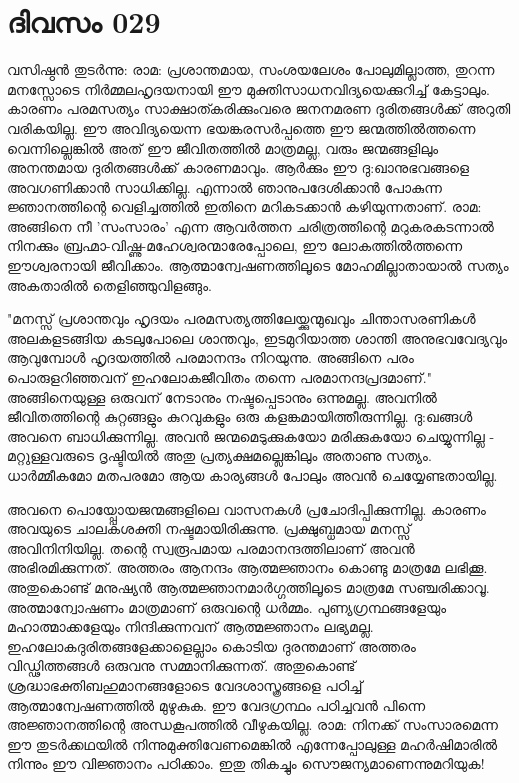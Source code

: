 \newpage
\section{ദിവസം 029}


വസിഷ്ഠന്‍ തുടര്‍ന്നു: രാമ: പ്രശാന്തമായ, സംശയലേശം പോലുമില്ലാത്ത, തുറന്ന മനസ്സോടെ നിര്‍മ്മലഹൃദയനായി ഈ മുക്തിസാധനവിദ്യയെക്കുറിച്ച്‌ കേട്ടാലും. കാരണം പരമസത്യം സാക്ഷാത്കരിക്കുംവരെ ജനനമരണ ദുരിതങ്ങള്‍ക്ക്‌ അറുതി വരികയില്ല. ഈ അവിദ്യയെന്ന ഭയങ്കരസര്‍പ്പത്തെ ഈ ജന്മത്തില്‍ത്തന്നെ വെന്നില്ലെങ്കില്‍ അത്‌ ഈ ജീവിതത്തില്‍ മാത്രമല്ല, വരും ജന്മങ്ങളിലും അനന്തമായ ദുരിതങ്ങള്‍ക്ക്‌ കാരണമാവും. ആര്‍ക്കും ഈ ദു:ഖാനുഭവങ്ങളെ അവഗണിക്കാന്‍ സാധിക്കില്ല. എന്നാല്‍ ഞാനുപദേശിക്കാന്‍ പോകുന്ന ജ്ഞാനത്തിന്റെ വെളിച്ചത്തില്‍ ഇതിനെ മറികടക്കാന്‍ കഴിയുന്നതാണ്‌. രാമ: അങ്ങിനെ നീ 'സംസാരം' എന്ന ആവര്‍ത്തന ചരിത്രത്തിന്റെ മറുകരകടന്നാല്‍ നിനക്കും ബ്രഹ്മാ-വിഷ്ണു-മഹേശ്വരന്മാരേപ്പോലെ, ഈ ലോകത്തില്‍ത്തന്നെ ഈശ്വരനായി ജീവിക്കാം. ആത്മാന്വേഷണത്തിലൂടെ മോഹമില്ലാതായാല്‍ സത്യം അകതാരില്‍ തെളിഞ്ഞുവിളങ്ങും. 

"മനസ്സ്‌ പ്രശാന്തവും ഹൃദയം പരമസത്യത്തിലേയ്ക്കുന്മുഖവും ചിന്താസരണികള്‍ അലകളടങ്ങിയ കടലുപോലെ ശാന്തവും, ഇടമുറിയാത്ത ശാന്തി അനുഭവവേദ്യവും ആവുമ്പോള്‍ ഹൃദയത്തില്‍ പരമാനന്ദം നിറയുന്നു. അങ്ങിനെ പരം പൊരുളറിഞ്ഞവന്‌ ഇഹലോകജീവിതം തന്നെ പരമാനന്ദപ്രദമാണ്‌." അങ്ങിനെയുള്ള ഒരുവന്‌ നേടാനും നഷ്ടപ്പെടാനും ഒന്നുമല്ല. അവനില്‍ ജീവിതത്തിന്റെ കുറ്റങ്ങളും കുറവുകളും ഒരു കളങ്കമായിത്തീരുന്നില്ല. ദു:ഖങ്ങള്‍ അവനെ ബാധിക്കുന്നില്ല. അവന്‍ ജന്മമെടുക്കുകയോ മരിക്കുകയോ ചെയ്യുന്നില്ല - മറ്റുള്ളവരുടെ ദൃഷ്ടിയില്‍ അതു പ്രത്യക്ഷമല്ലെങ്കിലും അതാണു സത്യം. ധാര്‍മ്മീകമോ മതപരമോ ആയ കാര്യങ്ങള്‍ പോലും അവന്‍ ചെയ്യേണ്ടതായില്ല.

അവനെ പൊയ്പ്പോയജന്മങ്ങളിലെ വാസനകള്‍ പ്രചോദിപ്പിക്കുന്നില്ല. കാരണം അവയുടെ ചാലകശക്തി നഷ്ടമായിരിക്കുന്നു. പ്രക്ഷുബ്ധമായ മനസ്സ്‌ അവിനിനിയില്ല. തന്റെ സ്വരൂപമായ പരമാനന്ദത്തിലാണ്‌ അവന്‍ അഭിരമിക്കുന്നത്‌. അത്തരം ആനന്ദം ആത്മജ്ഞാനം കൊണ്ടു മാത്രമേ ലഭിക്കൂ. അതുകൊണ്ട്‌ മനുഷ്യന്‍ ആത്മജ്ഞാനമാര്‍ഗ്ഗത്തിലൂടെ മാത്രമേ സഞ്ചരിക്കാവൂ. അത്മാന്വോഷണം മാത്രമാണ്‌ ഒരുവന്റെ ധര്‍മ്മം. പുണ്യഗ്രന്ഥങ്ങളേയും മഹാത്മാക്കളേയും നിന്ദിക്കുന്നവന്‌ ആത്മജ്ഞാനം ലഭ്യമല്ല. ഇഹലോകദുരിതങ്ങളേക്കാളെല്ലാം കൊടിയ ദുരന്തമാണ്‌ അത്തരം വിഡ്ഢിത്തങ്ങള്‍ ഒരുവനു സമ്മാനിക്കുന്നത്‌. അതുകൊണ്ട്‌ ശ്രദ്ധാഭക്തിബഹുമാനങ്ങളോടെ വേദശാസ്ത്രങ്ങളെ പഠിച്ച്‌ ആത്മാന്വേഷണത്തില്‍ മുഴുകുക. ഈ വേദഗ്രന്ഥം പഠിച്ചവന്‍ പിന്നെ അജ്ഞാനത്തിന്റെ അന്ധകൂപത്തില്‍ വീഴുകയില്ല. രാമ: നിനക്ക്‌ സംസാരമെന്ന ഈ തുടര്‍ക്കഥയില്‍ നിന്നുമുക്തിവേണമെങ്കില്‍ എന്നേപ്പോലുള്ള മഹര്‍ഷിമാരില്‍ നിന്നും ഈ വിജ്ഞാനം പഠിക്കാം. ഇതു തികച്ചും സൌജന്യമാണെന്നുമറിയുക!
